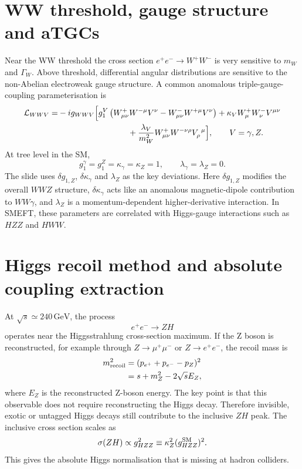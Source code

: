 \documentclass[11pt,a4paper]{report}
\newcommand{\ee}{e^+e^-}
\newcommand{\GeV}{\,\mathrm{GeV}}
\begin{document}
\section{WW threshold, gauge structure and aTGCs}
Near the WW threshold the cross section $\ee\to W^+W^-$ is very sensitive to $m_W$ and $\Gamma_W$.  Above threshold, differential angular distributions are sensitive to the non-Abelian electroweak gauge structure.  A common anomalous triple-gauge-coupling parameterisation is
\begin{align}
  \mathcal L_{WWV}=&-i g_{WWV}\Big[
  g_1^V\left(W^+_{\mu\nu}W^{-\mu}V^\nu-W^-_{\mu\nu}W^{+\mu}V^\nu\right)
  +\kappa_V W^+_\mu W^-_\nu V^{\mu\nu} \\
  &\hspace{3.0cm}
  +\frac{\lambda_V}{m_W^2}W^+_{\mu\nu}W^{-\nu\rho}V_{\rho}^{\ \mu}\Big],
  \qquad V=\gamma,Z.
\end{align}
At tree level in the SM,
\begin{equation}
  g_1^\gamma=g_1^Z=\kappa_\gamma=\kappa_Z=1,
  \qquad
  \lambda_\gamma=\lambda_Z=0.
\end{equation}
The slide uses $\delta g_{1,Z}$, $\delta\kappa_\gamma$ and $\lambda_Z$ as the key deviations.  Here $\delta g_{1,Z}$ modifies the overall $WWZ$ structure, $\delta\kappa_\gamma$ acts like an anomalous magnetic-dipole contribution to $WW\gamma$, and $\lambda_Z$ is a momentum-dependent higher-derivative interaction.  In SMEFT, these parameters are correlated with Higgs-gauge interactions such as $HZZ$ and $HWW$.

\section{Higgs recoil method and absolute coupling extraction}
At $\sqrt{s}\simeq240\GeV$, the process
\begin{equation}
  \ee\to ZH
\end{equation}
operates near the Higgsstrahlung cross-section maximum.  If the Z boson is reconstructed, for example through $Z\to\mu^+\mu^-$ or $Z\to e^+e^-$, the recoil mass is
\begin{align}
  m_{\rm recoil}^2&=(p_{e^+}+p_{e^-}-p_Z)^2 \\
  &=s+m_Z^2-2\sqrt{s}E_Z,
\end{align}
where $E_Z$ is the reconstructed Z-boson energy.  The key point is that this observable does not require reconstructing the Higgs decay.  Therefore invisible, exotic or untagged Higgs decays still contribute to the inclusive $ZH$ peak.  The inclusive cross section scales as
\begin{equation}
  \sigma(ZH)\propto g_{HZZ}^2\equiv \kappa_Z^2(g_{HZZ}^{\rm SM})^2.
\end{equation}
This gives the absolute Higgs normalisation that is missing at hadron colliders.
\end{document}
